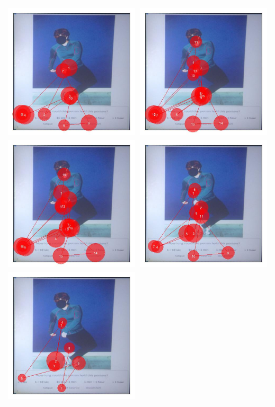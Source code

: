 \documentclass[11pt]{asaproc}
\begin{document}
\begin{figure}[t]
\begin{center}
\includegraphics[width=0.30\textwidth]{figures/Subject13_scanpath_posture8_lambda_3.jpg} \hspace{1pt}
\includegraphics[width=0.30\textwidth]{figures/Subject13_scanpath_posture8_lambda_5.jpg} \\
\includegraphics[width=0.30\textwidth]{figures/Subject13_scanpath_posture8_lambda_8.jpg} \hspace{1pt}
\includegraphics[width=0.30\textwidth]{figures/Subject13_scanpath_posture8_lambda_10.jpg} \\
\includegraphics[width=0.30\textwidth]{figures/Subject13_scanpath_posture8_lambda_12.jpg} \hspace{1pt}

\end{center}
\end{figure}
\end{document}
